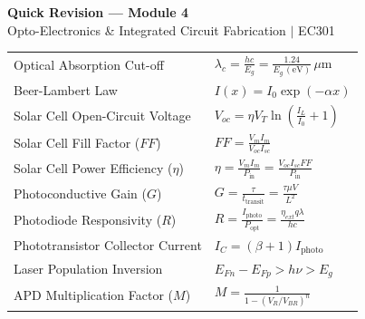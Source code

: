\documentclass[12pt,a4paper]{article}
\renewcommand{\arraystretch}{1.45}
\begin{document}
\newpage
\begin{center}
  {\large\bfseries\color{myred} Quick Revision --- Module 4}\\[3pt]
  {\small\color{mydark} Opto-Electronics \& Integrated Circuit Fabrication $|$ EC301}
\end{center}
\noindent{\color{myred}\rule{\linewidth}{1.2pt}}
\vspace{4pt}

\begin{tcolorbox}[formulabox, title={\textbf{Key Formulas and Metrics at a Glance}}]
\renewcommand{\arraystretch}{1.35}
\begin{tabularx}{\linewidth}{B{5.0cm} X}
Optical Absorption Cut-off & $\lambda_c = \frac{hc}{E_g} = \frac{1.24}{E_g\,(\text{eV})}\,\mu\text{m}$ \\[4pt]
Beer-Lambert Law & $I(x) = I_0 \exp(-\alpha x)$ \\[4pt]
Solar Cell Open-Circuit Voltage & $V_{oc} = \eta V_T \ln\left(\frac{I_L}{I_0} + 1\right)$ \\[4pt]
Solar Cell Fill Factor ($FF$) & $FF = \frac{V_m I_m}{V_{oc} I_{sc}}$ \\[4pt]
Solar Cell Power Efficiency ($\eta$) & $\eta = \frac{V_m I_m}{P_{\text{in}}} = \frac{V_{oc} I_{sc} FF}{P_{\text{in}}}$ \\[4pt]
Photoconductive Gain ($G$) & $G = \frac{\tau}{t_{\text{transit}}} = \frac{\tau \mu V}{L^2}$ \\[4pt]
Photodiode Responsivity ($R$) & $R = \frac{I_{\text{photo}}}{P_{\text{opt}}} = \frac{\eta_{ext} q \lambda}{hc}$ \\[4pt]
Phototransistor Collector Current & $I_C = (\beta + 1) I_{\text{photo}}$ \\[4pt]
Laser Population Inversion & $E_{Fn} - E_{Fp} > h\nu > E_g$ \\[4pt]
APD Multiplication Factor ($M$) & $M = \frac{1}{1 - (V_R / V_{BR})^n}$ \\[4pt]
\end{tabularx}
\end{tcolorbox}
\end{document}
